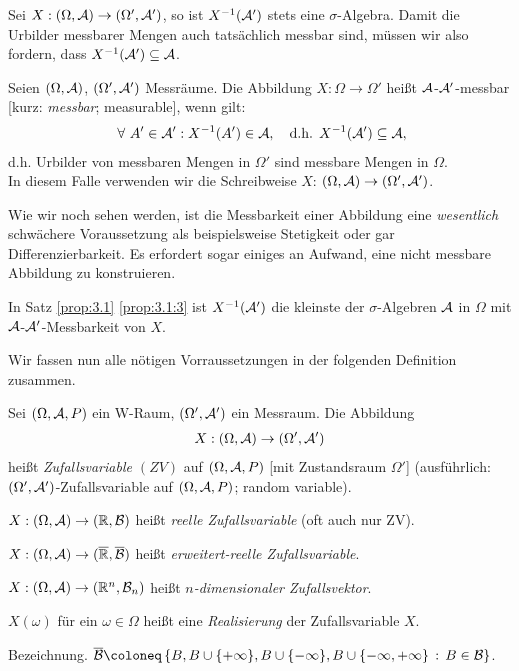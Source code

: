 Sei $X:(\Omega,\AA)\to (\Omega',\AA')$, so ist $X^{-1}(\AA')$ stets eine
$\sigma$-Algebra. Damit die Urbilder messbarer Mengen auch tatsächlich messbar
sind, müssen wir also fordern, dass $X^{-1}(\AA')\subseteq \AA$.

\begin{defn}
\label{3.2}
Seien $(\Omega ,\AA)$, $(\Omega ', \AA')$ Messräume.
Die Abbildung $X:\Omega \to \Omega '$ heißt $\AA$-${\cal A'}$-messbar
[kurz: \emph{messbar}; measurable], wenn gilt:
\begin{align*}
\forall {A' \in \AA'} : X^{-1}(A') \in \AA,
\quad \text{d.h. } X^{-1}(\AA') \subseteq \AA,
\end{align*}
d.h. Urbilder von messbaren Mengen in $\Omega '$ sind messbare Mengen in
$\Omega $.\\
 In diesem Falle verwenden wir die Schreibweise $X$: $(\Omega, \AA) \to (\Omega
 ', \AA')$.\fishhere
\end{defn}

Wie wir noch sehen werden, ist die Messbarkeit einer Abbildung eine
\textit{wesentlich} schwächere Voraussetzung als beispielsweise Stetigkeit oder
gar Differenzierbarkeit. Es erfordert sogar einiges an Aufwand, eine nicht
messbare Abbildung zu konstruieren.

\begin{bem}
\label{bem:3.1}
In Satz \ref{prop:3.1} \ref{prop:3.1:3} ist $X^{-1}(\AA')$ die kleinste der
$\sigma$-Algebren $\AA$ in $\Omega$ mit $\AA$-$\AA'$-Messbarkeit
von $X$.\maphere
\end{bem}

Wir fassen nun alle nötigen Vorraussetzungen in der folgenden Definition
zusammen.

\begin{defn}
\label{defn:3.3}
Sei $(\Omega, \AA, P)$ ein W-Raum, $(\Omega ', {\cal
A}')$ ein Messraum. Die Abbildung
\begin{align*}
X:(\Omega , \AA) \to (\Omega ', \AA')
\end{align*}
heißt \emph{Zufallsvariable $(ZV)$} auf $(\Omega, \AA,P)$
[mit Zustandsraum $\Omega '$] (ausführlich: $(\Omega ', \AA')$-Zufallsvariable auf
$(\Omega, \AA, P)$; random variable).

\begin{defnenum}
  \item $X: (\Omega,\AA) \to (\R, {\cal B})$ heißt \emph{reelle Zufallsvariable} 
(oft auch nur ZV).
\item $X: (\Omega, \AA) \to (\overline{\R}, \overline{\cal B})$ heißt 
\emph{ erweitert-reelle Zufallsvariable}.
\item $X: (\Omega, \AA) \to (\R^{n}, {\cal B}_{n})$ heißt 
\emph{$n$-dimensionaler Zufallsvektor}.
\item $X(\omega)$ für ein $\omega \in \Omega $ heißt eine \emph{Realisierung}
der Zufallsvariable $X$.   
\end{defnenum}
Bezeichnung. $\overline{\BB}\defl \setdef{B, B \cup \{+ \infty \}, B \cup \{
-\infty \},  B\cup \{- \infty , + \infty \}}{B \in {\BB}}$.\fishhere
\end{defn}

